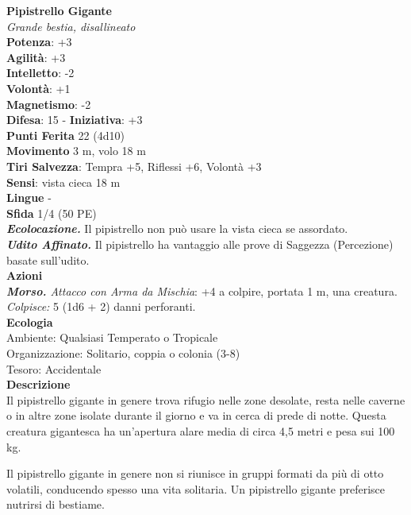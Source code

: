 \begin{multicols}{2}
\medskip\textbf{Pipistrello Gigante}\\
\emph{Grande bestia, disallineato}\\
\textbf{Potenza}: +3\\
\textbf{Agilità}: +3\\
\textbf{Intelletto}: -2\\
\textbf{Volontà}: +1\\
\textbf{Magnetismo}: -2\\
\textbf{Difesa}: 15 - \textbf{Iniziativa}: +3\\
\textbf{Punti Ferita} 22 (4d10)\\
\textbf{Movimento} 3 m, volo 18 m\\
\textbf{Tiri Salvezza}: Tempra +5, Riflessi +6, Volontà +3 \\
\textbf{Sensi}: vista cieca 18 m\\
\textbf{Lingue} -\\
\textbf{Sfida} 1/4 (50 PE)\smallskip\\
\emph{\textbf{Ecolocazione.}} Il pipistrello non può usare la vista cieca se assordato.\\
\emph{\textbf{Udito Affinato.}} Il pipistrello ha vantaggio alle prove di Saggezza (Percezione) basate sull'udito.\\
\smallskip\textbf{Azioni}\\
\emph{\textbf{Morso.} Attacco con Arma da Mischia}: +4 a colpire, portata 1 m, una creatura.\\
\emph{Colpisce:} 5 (1d6 + 2) danni perforanti.\\
\textbf{Ecologia}\\
Ambiente: Qualsiasi Temperato o Tropicale\\
Organizzazione: Solitario, coppia o colonia (3-8)\\
Tesoro: Accidentale \\
\textbf{Descrizione}\\

Il pipistrello gigante in genere trova rifugio nelle zone desolate, resta nelle caverne o in altre zone isolate durante il giorno e va in cerca di prede di notte. Questa creatura gigantesca ha un’apertura alare media di circa 4,5 metri e pesa sui 100 kg.

Il pipistrello gigante in genere non si riunisce in gruppi formati da più di otto volatili, conducendo spesso una vita solitaria. Un pipistrello gigante preferisce nutrirsi di bestiame. 


\end{multicols}
